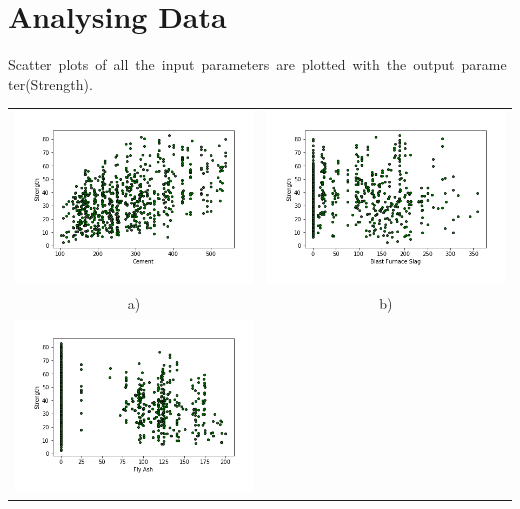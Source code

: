 \section{Analysing Data}
\hbox{Scatter plots of all the input parameters are plotted with the output parameter(Strength).}
\begin{center}
    \begin{tabular}{cc}
        \includegraphics[scale=0.5]{images/Plot_01.png}&
        \includegraphics[scale=0.5]{images/Plot_02.png}\\
        a) & b)\\
        \includegraphics[scale=0.5]{images/Plot_03.png}&

\end{tabular}
\end{center}
